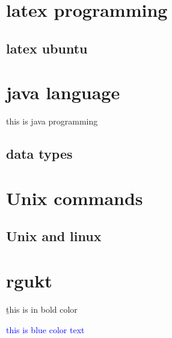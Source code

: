 \documentclass{article}
\begin{document}
	
	\author{Md azhar}
	
	
	\tableofcontents
	\newpage
	
	\section{latex programming} \label{sec:intro}
	\subsection{latex ubuntu}
	
	\section{java language} \label{sec:java}
	this is java programming
	\subsection{data types}
	
	\section{Unix commands} \label{sec:Unix}
	\subsection{Unix and linux}
	
	\section{rgukt}
	\b{this is in bold color}
	
	
	\textcolor{blue}{this is blue color text}
\end{document}
